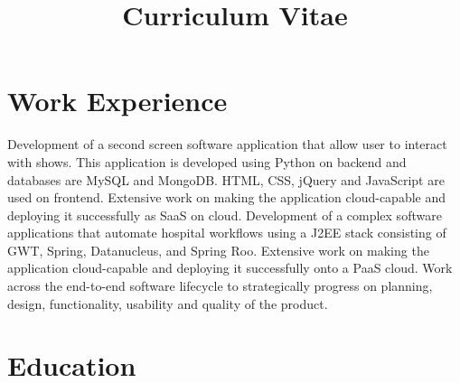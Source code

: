 \documentclass[12pt,a4paper]{moderncv}
\title{Curriculum Vitae}       %
\begin{document}
\maketitle

\section{Work Experience}
{Development of a second screen software application that allow user to interact with shows. This application is developed using Python on backend and databases are MySQL and MongoDB. HTML, CSS, jQuery and JavaScript are used on frontend. Extensive work on making the application cloud-capable and deploying it successfully as SaaS on cloud.}
\vspace{.1in}
{Development of a complex software applications that automate hospital workflows using a J2EE stack consisting of GWT, Spring, Datanucleus, and Spring Roo. Extensive work on making the application cloud-capable and deploying it successfully onto a PaaS cloud. Work across the end-to-end software lifecycle to strategically progress on planning, design, functionality, usability and quality of the product.}


\section{Education}


\end{document}

